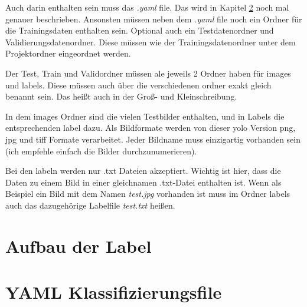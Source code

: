 Auch darin enthalten sein muss das \textit{.yaml} file. Das wird in Kapitel \ref{sec:yaml_class} noch mal genauer beschrieben. Ansonsten müssen neben dem \textit{.yaml} file noch ein Ordner für die Trainingsdaten enthalten sein. Optional auch ein Testdatenordner und Validierungsdatenordner. Diese müssen wie der Trainingsdatenordner unter dem Projektordner eingeordnet werden.

Der Test, Train und Validordner müssen ale jeweils 2 Ordner haben für images und labels. Diese müssen auch über die verschiedenen ordner exakt gleich benannt sein. Das heißt auch in der Groß- und Kleinschreibung. 

In dem images Ordner sind die vielen Testbilder enthalten, und in Labels die entsprechenden label dazu. Als Bildformate werden von dieser \ac{yolo} Version png, jpg und tiff Formate verarbeitet. Jeder Bildname muss einzigartig vorhanden sein (ich empfehle einfach die Bilder durchzunumerieren).

Bei den labeln werden nur .txt Dateien akzeptiert. Wichtig ist hier, dass die Daten zu einem Bild in einer gleichnamen .txt-Datei enthalten ist. Wenn als Beispiel ein Bild mit dem Namen \textit{test.jpg} vorhanden ist muss im Ordner labels auch das dazugehörige Labelfile \textit{test.txt} heißen.

\section{Aufbau der Label}


\section{YAML Klassifizierungsfile}
\label{sec:yaml_class}
